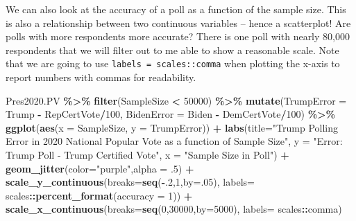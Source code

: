 \documentclass[
]{article}
\newenvironment{Shaded}{\begin{snugshade}}{\end{snugshade}}
\newcommand{\AttributeTok}[1]{\textcolor[rgb]{0.13,0.29,0.53}{#1}}
\newcommand{\DecValTok}[1]{\textcolor[rgb]{0.00,0.00,0.81}{#1}}
\newcommand{\FunctionTok}[1]{\textcolor[rgb]{0.13,0.29,0.53}{\textbf{#1}}}
\newcommand{\NormalTok}[1]{#1}
\newcommand{\SpecialCharTok}[1]{\textcolor[rgb]{0.81,0.36,0.00}{\textbf{#1}}}
\newcommand{\StringTok}[1]{\textcolor[rgb]{0.31,0.60,0.02}{#1}}
\begin{document}
We can also look at the accuracy of a poll as a function of the sample
size. This is also a relationship between two continuous variables --
hence a scatterplot! Are polls with more respondents more accurate?
There is one poll with nearly 80,000 respondents that we will filter out
to me able to show a reasonable scale. Note that we are going to use
\texttt{labels\ =\ scales::comma} when plotting the x-axis to report
numbers with commas for readability.

\begin{Shaded}
\begin{Highlighting}[]
\NormalTok{Pres2020.PV }\SpecialCharTok{\%\textgreater{}\%}
  \FunctionTok{filter}\NormalTok{(SampleSize }\SpecialCharTok{\textless{}} \DecValTok{50000}\NormalTok{) }\SpecialCharTok{\%\textgreater{}\%}
  \FunctionTok{mutate}\NormalTok{(}\AttributeTok{TrumpError =}\NormalTok{ Trump }\SpecialCharTok{{-}}\NormalTok{ RepCertVote}\SpecialCharTok{/}\DecValTok{100}\NormalTok{,}
         \AttributeTok{BidenError =}\NormalTok{ Biden }\SpecialCharTok{{-}}\NormalTok{ DemCertVote}\SpecialCharTok{/}\DecValTok{100}\NormalTok{) }\SpecialCharTok{\%\textgreater{}\%}
  \FunctionTok{ggplot}\NormalTok{(}\FunctionTok{aes}\NormalTok{(}\AttributeTok{x =}\NormalTok{ SampleSize, }\AttributeTok{y =}\NormalTok{ TrumpError)) }\SpecialCharTok{+} 
  \FunctionTok{labs}\NormalTok{(}\AttributeTok{title=}\StringTok{"Trump Polling Error in 2020 National Popular Vote as a function of Sample Size"}\NormalTok{,}
       \AttributeTok{y =} \StringTok{"Error: Trump Poll {-} Trump Certified Vote"}\NormalTok{,}
       \AttributeTok{x =} \StringTok{"Sample Size in Poll"}\NormalTok{) }\SpecialCharTok{+} 
  \FunctionTok{geom\_jitter}\NormalTok{(}\AttributeTok{color=}\StringTok{"purple"}\NormalTok{,}\AttributeTok{alpha =}\NormalTok{ .}\DecValTok{5}\NormalTok{) }\SpecialCharTok{+}
  \FunctionTok{scale\_y\_continuous}\NormalTok{(}\AttributeTok{breaks=}\FunctionTok{seq}\NormalTok{(}\SpecialCharTok{{-}}\NormalTok{.}\DecValTok{2}\NormalTok{,}\DecValTok{1}\NormalTok{,}\AttributeTok{by=}\NormalTok{.}\DecValTok{05}\NormalTok{),}
                     \AttributeTok{labels=}\NormalTok{ scales}\SpecialCharTok{::}\FunctionTok{percent\_format}\NormalTok{(}\AttributeTok{accuracy =} \DecValTok{1}\NormalTok{)) }\SpecialCharTok{+}
  \FunctionTok{scale\_x\_continuous}\NormalTok{(}\AttributeTok{breaks=}\FunctionTok{seq}\NormalTok{(}\DecValTok{0}\NormalTok{,}\DecValTok{30000}\NormalTok{,}\AttributeTok{by=}\DecValTok{5000}\NormalTok{),}
                     \AttributeTok{labels=}\NormalTok{ scales}\SpecialCharTok{::}\NormalTok{comma) }
\end{Highlighting}
\end{Shaded}
\end{document}
